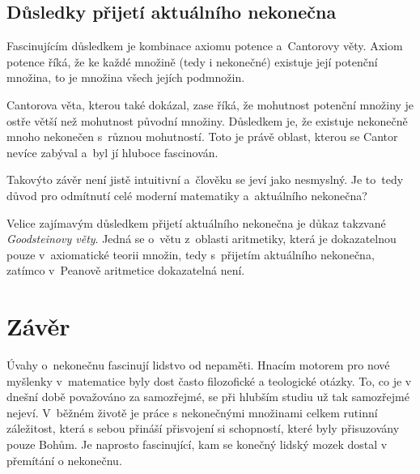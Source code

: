 \documentclass[czech]{article}
\begin{document}
\subsection*{Důsledky přijetí aktuálního nekonečna}

Fascinujícím důsledkem je kombinace axiomu potence a~Cantorovy věty. Axiom potence říká, že ke každé množině (tedy i nekonečné) existuje její potenční množina, to je množina všech jejích podmnožin.

Cantorova věta, kterou také dokázal, zase říká, že mohutnost potenční množiny je ostře větší než mohutnost původní množiny. Důsledkem je, že existuje nekonečně mnoho nekonečen s~různou mohutností.
Toto je právě oblast, kterou se Cantor nevíce zabýval a~byl jí hluboce fascinován.

Takovýto závěr není jistě intuitivní a~člověku se jeví jako nesmyslný. Je to~tedy důvod pro odmítnutí celé moderní matematiky a~aktuálního nekonečna? 

Velice zajímavým důsledkem přijetí aktuálního nekonečna je důkaz takzvané \textit{Goodsteinovy věty}. Jedná se o~větu z~oblasti aritmetiky, která je dokazatelnou pouze v~axiomatické teorii množin, tedy s~přijetím aktuálního nekonečna, zatímco v~Peanově aritmetice dokazatelná není. \cite{goodstein}

\section*{Závěr}

Úvahy o~nekonečnu fascinují lidstvo od nepaměti. Hnacím motorem pro nové myšlenky v~matematice byly dost často filozofické a teologické otázky. To, co je v dnešní době považováno za samozřejmé, se při hlubším studiu už tak samozřejmé nejeví. V~běžném životě je práce s nekonečnými množinami celkem rutinní záležitost, která s sebou přináší přisvojení si schopností, které byly přisuzovány pouze Bohům. Je naprosto fascinující, kam se konečný lidský mozek dostal v přemítání o nekonečnu.


\newpage
\end{document}

